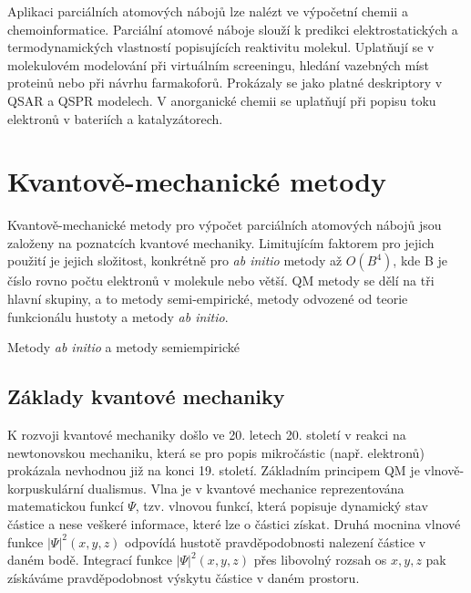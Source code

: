 
Aplikaci parciálních atomových nábojů lze nalézt ve výpočetní chemii a chemoinformatice. Parciální atomové náboje slouží k predikci elektrostatických a termodynamických vlastností popisujících reaktivitu molekul. Uplatňují se v molekulovém modelování při virtuálním screeningu, hledání vazebných míst proteinů nebo při návrhu farmakoforů. Prokázaly se jako platné deskriptory v QSAR a QSPR modelech. V anorganické chemii se uplatňují při popisu toku elektronů v bateriích a katalyzátorech. 


\section{Kvantově-mechanické metody}
Kvantově-mechanické metody pro výpočet parciálních atomových nábojů jsou založeny na poznatcích kvantové mechaniky. Limitujícím faktorem pro jejich použití je jejich složitost, konkrétně pro \textit{ab initio} metody až $O(B^4)$, kde B je číslo rovno počtu elektronů v molekule nebo větší. QM metody se dělí na tři hlavní skupiny, a to metody semi-empirické, metody odvozené od teorie funkcionálu hustoty a metody \textit{ab initio}.

Metody \textit{ab initio} a metody semiempirické 

\subsection{Základy kvantové mechaniky}
K rozvoji kvantové mechaniky došlo ve 20. letech 20. století v reakci na newtonovskou mechaniku, která se pro popis mikročástic (např. elektronů) prokázala nevhodnou již na konci 19. století.  
Základním principem QM je vlnově-korpuskulární dualismus. %
Vlna je v kvantové mechanice reprezentována matematickou funkcí $\Psi$, tzv. vlnovou funkcí, která popisuje dynamický stav částice a nese veškeré informace, které lze o částici získat. Druhá mocnina vlnové funkce ${\lvert \Psi \rvert}^2(x, y, z)$ odpovídá hustotě pravděpodobnosti nalezení částice v daném bodě. Integrací funkce  ${\lvert \Psi \rvert}^2(x, y, z)$ přes libovolný rozsah os $x, y, z$ pak získáváme pravděpodobnost výskytu částice v daném prostoru.%

